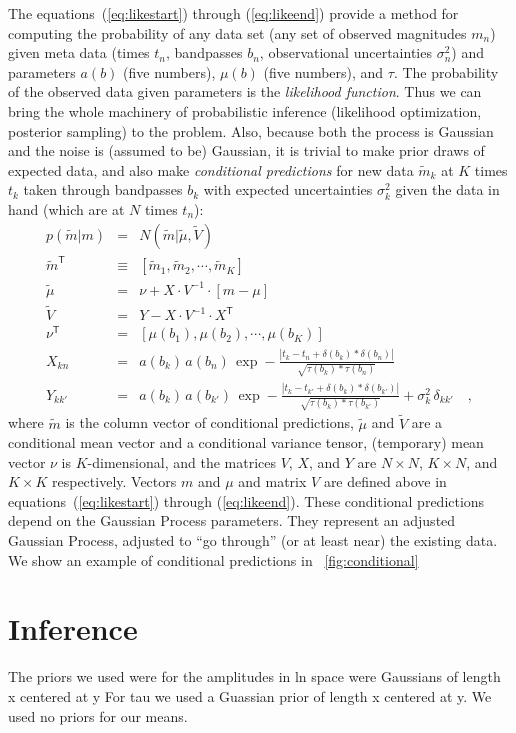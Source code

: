\documentclass[letterpaper,12pt,preprint]{aastex}
\newcommand{\transpose}[1]{{#1}^{\mathsf{T}}}
\newcommand{\inverse}[1]{{#1}^{-1}}
\begin{document}
The equations~(\ref{eq:likestart}) through (\ref{eq:likeend})
provide a method for computing the probability of any data set (any
set of observed magnitudes $m_n$) given meta data (times $t_n$,
bandpasses $b_n$, observational uncertainties $\sigma_n^2$) and
parameters $a(b)$ (five numbers), $\mu(b)$ (five numbers), and $\tau$.
The probability of the observed data given parameters is the
\emph{likelihood function}.  Thus we can bring the whole machinery of
probabilistic inference (likelihood optimization, posterior sampling)
to the problem.  Also, because both the process is Gaussian and the
noise is (assumed to be) Gaussian, it is trivial to make prior draws
of expected data, and also make \emph{conditional predictions} for new
data $\tilde{m}_k$ at $K$ times $t_k$ taken through bandpasses $b_k$ with
expected uncertainties $\sigma_k^2$ given the data in hand (which are
at $N$ times $t_n$):
\begin{eqnarray}
p(\tilde{m}|m) &=& N(\tilde{m}|\tilde{\mu},\tilde{V})
\\
\transpose{\tilde{m}} &\equiv& [\tilde{m}_1, \tilde{m}_2, \cdots , \tilde{m}_K]
\\
\tilde{\mu} &=& \nu + X\cdot\inverse{V}\cdot [m - \mu]
\\
\tilde{V} &=& Y - X\cdot\inverse{V}\cdot\transpose{X}
\\
\transpose{\nu} &=& [\mu(b_1), \mu(b_2), \cdots , \mu(b_K)]
\\
X_{kn} &=& a(b_k)\,a(b_n)\,\exp -\frac{|t_k - t_n + \delta(b_k) * \delta(b_n)|}{\sqrt{\tau(b_k)*\tau(b_n)}}
\\
Y_{kk'} &=& a(b_k)\,a(b_{k'})\,\exp -\frac{|t_k - t_{k'}+\delta(b_k) * \delta(b_{k'})|}{\sqrt{\tau(b_k)*\tau(b_{k'})}} + \sigma_k^2\,\delta_{kk'}
\quad ,
\end{eqnarray}
where $\tilde{m}$ is the column vector of conditional predictions,
$\tilde{\mu}$ and $\tilde{V}$ are a conditional mean vector and a
conditional variance tensor, (temporary) mean vector $\nu$ is
$K$-dimensional, and the matrices $V$, $X$, and $Y$ are $N\times N$,
$K\times N$, and $K\times K$ respectively.  Vectors $m$ and $\mu$ and
matrix $V$ are defined above in equations~(\ref{eq:likestart}) through
(\ref{eq:likeend}).  These conditional predictions depend on the
Gaussian Process parameters.  They represent an adjusted Gaussian
Process, adjusted to ``go through'' (or at least near) the existing
data.  We show an example of conditional predictions in
\figurename~\ref{fig:conditional}

\section{Inference}
The priors we used were for the amplitudes in ln space were Gaussians of length x centered at y 
For tau we used a Guassian prior of length x centered at y.
We used no priors for our means.
\end{document}
